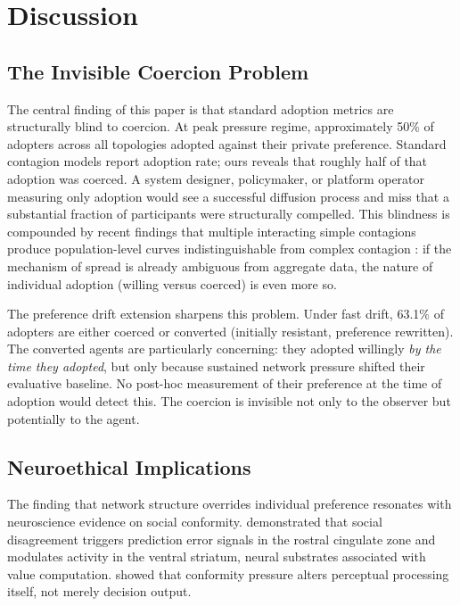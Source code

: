 \documentclass[11pt, a4paper]{article}
\begin{document}
\section{Discussion}
\label{sec:discussion}

\subsection{The Invisible Coercion Problem}

The central finding of this paper is that standard adoption metrics are structurally blind to coercion. At peak pressure regime, approximately 50\% of adopters across all topologies adopted against their private preference. Standard contagion models report adoption rate; ours reveals that roughly half of that adoption was coerced. A system designer, policymaker, or platform operator measuring only adoption would see a successful diffusion process and miss that a substantial fraction of participants were structurally compelled. This blindness is compounded by recent findings that multiple interacting simple contagions produce population-level curves indistinguishable from complex contagion \citep{hebert2020macroscopic}: if the mechanism of spread is already ambiguous from aggregate data, the nature of individual adoption (willing versus coerced) is even more so.

The preference drift extension sharpens this problem. Under fast drift, 63.1\% of adopters are either coerced or converted (initially resistant, preference rewritten). The converted agents are particularly concerning: they adopted willingly \textit{by the time they adopted}, but only because sustained network pressure shifted their evaluative baseline. No post-hoc measurement of their preference at the time of adoption would detect this. The coercion is invisible not only to the observer but potentially to the agent.

\subsection{Neuroethical Implications}

The finding that network structure overrides individual preference resonates with neuroscience evidence on social conformity. \citet{klucharev2009reinforcement} demonstrated that social disagreement triggers prediction error signals in the rostral cingulate zone and modulates activity in the ventral striatum, neural substrates associated with value computation. \citet{berns2005neurobiological} showed that conformity pressure alters perceptual processing itself, not merely decision output.
\end{document}
